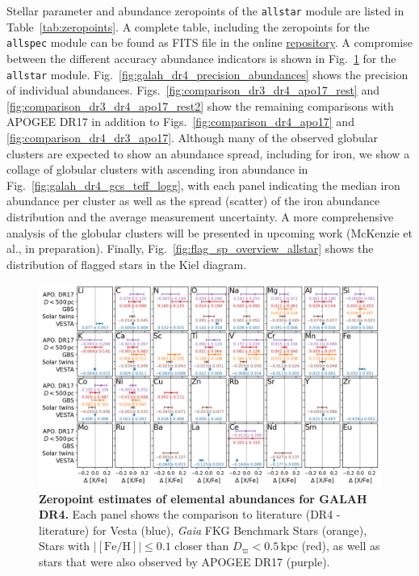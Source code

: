 \documentclass[
  journal=pasa,
  manuscript=research-paper, %
  year=2024,
  volume=37
]{cup-journal}
\newcommand{\Gaia}{\textit{Gaia}\xspace}
\begin{document}

Stellar parameter and abundance zeropoints of the \texttt{allstar} module are listed in Table~\ref{tab:zeropoints}. A complete table, including the zeropoints for the \texttt{allspec} module can be found as FITS file in the online \href{https://github.com/svenbuder/GALAH_DR4/blob/main/catalogs/galah_dr4_zeropoints_240705.fits}{repository}. A compromise between the different accuracy abundance indicators is shown in Fig.~\ref{fig:galah_dr4_zeropoint_checks_allstar} for the \texttt{allstar} module. Fig.~\ref{fig:galah_dr4_precision_abundances} shows the precision of individual abundances. Figs.~\ref{fig:comparison_dr3_dr4_apo17_rest} and \ref{fig:comparison_dr3_dr4_apo17_rest2} show the remaining comparisons with APOGEE DR17 in addition to Figs.~\ref{fig:comparison_dr4_apo17} and \ref{fig:comparison_dr4_dr3_apo17}.
Although many of the observed globular clusters are expected to show an abundance spread, including for iron, we show a collage of globular clusters with ascending iron abundance in Fig.~\ref{fig:galah_dr4_gcs_teff_logg}, with each panel indicating the median iron abundance per cluster as well as the spread (scatter) of the iron abundance distribution and the average measurement uncertainty. A more comprehensive analysis of the globular clusters will be presented in upcoming work (McKenzie et al., in preparation). Finally, Fig.~\ref{fig:flag_sp_overview_allstar} shows the distribution of flagged stars in the Kiel diagram.



\begin{figure}[ht]
 \centering
 \includegraphics[width=\textwidth]{figures/galah_dr4_zeropoint_checks_allstar.png}
 \caption{\textbf{Zeropoint estimates of elemental abundances for GALAH DR4.} Each panel shows the comparison to literature (DR4 - literature) for Vesta (blue), \Gaia FKG Benchmark Stars (orange), Stars with $\vert \mathrm{[Fe/H]} \vert \leq 0.1$ closer than $D_\varpi < 0.5\,\mathrm{kpc}$ (red), as well as stars that were also observed by APOGEE DR17 (purple).}
 \label{fig:galah_dr4_zeropoint_checks_allstar}
\end{figure}
\end{document}
